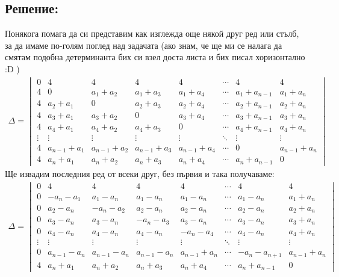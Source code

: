 \documentclass[a4paper, 12pt, oneside]{article}
\begin{document}
\subsection*{Решение:}
Понякога помага да си представим как изглежда още някой друг ред или стълб, за да имаме по-голям поглед над задачата
(ако знам, че ще ми се налага да смятам подобна детерминанта бих си взел доста листа и бих писал хоризонтално :D )
\begin{align*}
\Delta = \begin{vmatrix}
    0 & 4 & 4 & 4 & 4 & \cdots & 4  & 4 \\
    4 & 0 & a_1 + a_2 & a_1 + a_3 & a_1 + a_4 & \cdots & a_1 + a_{n - 1} & a_1 + a_n \\
    4 & a_2 + a_1 & 0 & a_2 + a_3 & a_2 + a_4 & \cdots & a_2 + a_{n - 1} & a_2 + a_n \\
    4 & a_3 + a_1 & a_3 + a_2 & 0 & a_3 + a_4 & \cdots & a_3 + a_{n - 1} & a_3 + a_n \\
    4 & a_4 + a_1 & a_4 + a_2 & a_4 + a_3 & 0 & \cdots & a_4 + a_{n - 1} & a_4 + a_n \\
    \vdots & \vdots & \vdots & \vdots & \vdots & \ddots & \vdots & \vdots \\
    4 & a_{n - 1} + a_1 & a_{n - 1} + a_2 & a_{n - 1} + a_3 & a_{n - 1} + a_4 & \cdots & 0 & a_{n - 1} + a_n \\
    4 & a_n + a_1 & a_n + a_2 & a_n + a_3 & a_n + a_4 & \cdots & a_n + a_{n - 1} & 0
\end{vmatrix}
\end{align*}
Ще извадим последния ред от всеки друг, без първия и така получаваме:
\begin{align*}
\Delta = \begin{vmatrix}
    0 & 4 & 4 & 4 & 4 & \cdots & 4  & 4 \\
    0 & -a_n - a_1 & a_1 - a_n & a_1 - a_n & a_1 - a_n & \cdots & a_1 - a_n & a_1 + a_n \\
    0 & a_2 - a_n & -a_n - a_2 & a_2 - a_n & a_2 - a_n & \cdots & a_2 - a_n & a_2 + a_n \\
    0 & a_3 - a_n & a_3 - a_n & -a_n - a_3 & a_3 - a_n & \cdots & a_3 - a_n & a_3 + a_n \\
    0 & a_4 - a_n & a_4 - a_n & a_4 - a_n & -a_n - a_4 & \cdots & a_4 - a_n & a_4 + a_n \\
    \vdots & \vdots & \vdots & \vdots & \vdots & \ddots & \vdots & \vdots \\
    0 & a_{n - 1} - a_n & a_{n - 1} - a_n & a_{n - 1} - a_n & a_{n - 1} + a_n & \cdots & - a_n - a_{n + 1} & a_{n - 1} + a_n \\
    4 & a_n + a_1 & a_n + a_2 & a_n + a_3 & a_n + a_4 & \cdots & a_n + a_{n - 1} & 0
\end{vmatrix}
\end{align*}
\end{document}
